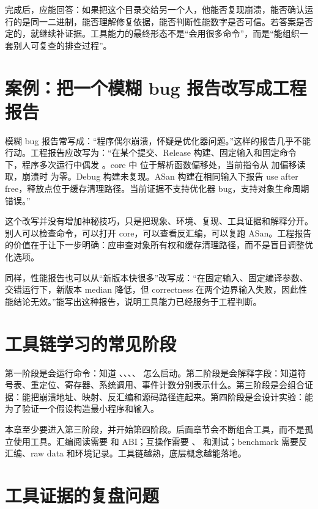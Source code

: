 完成后，应能回答：如果把这个目录交给另一个人，他能否复现崩溃，能否确认运行的是同一二进制，能否理解修复依据，能否判断性能数字是否可信。若答案是否定的，就继续补证据。工具能力的最终形态不是“会用很多命令”，而是“能组织一套别人可复查的排查过程”。

\section{案例：把一个模糊 bug 报告改写成工程报告}

模糊 bug 报告常写成：“程序偶尔崩溃，怀疑是优化器问题。”这样的报告几乎不能行动。工程报告应改写为：“在某个提交、Release 构建、固定输入和固定命令下，程序多次运行中偶发 。core 中  位于解析函数偏移处，当前指令从  加偏移读取，崩溃时  为零。Debug 构建未复现。ASan 构建在相同输入下报告 use after free，释放点位于缓存清理路径。当前证据不支持优化器 bug，支持对象生命周期错误。”

这个改写并没有增加神秘技巧，只是把现象、环境、复现、工具证据和解释分开。别人可以检查命令，可以打开 core，可以查看反汇编，可以复跑 ASan。工程报告的价值在于让下一步明确：应审查对象所有权和缓存清理路径，而不是盲目调整优化选项。

同样，性能报告也可以从“新版本快很多”改写成：“在固定输入、固定编译参数、交错运行下，新版本 median 降低，但 correctness 在两个边界输入失败，因此性能结论无效。”能写出这种报告，说明工具能力已经服务于工程判断。

\section{工具链学习的常见阶段}

第一阶段是会运行命令：知道 、、、、 怎么启动。第二阶段是会解释字段：知道符号表、重定位、寄存器、系统调用、事件计数分别表示什么。第三阶段是会组合证据：能把崩溃地址、映射、反汇编和源码路径连起来。第四阶段是会设计实验：能为了验证一个假设构造最小程序和输入。

本章至少要进入第三阶段，并开始第四阶段。后面章节会不断组合工具，而不是孤立使用工具。汇编阅读需要  和 ABI；互操作需要 、 和测试；benchmark 需要反汇编、raw data 和环境记录。工具链越熟，底层概念越能落地。

\section{工具证据的复盘问题}

